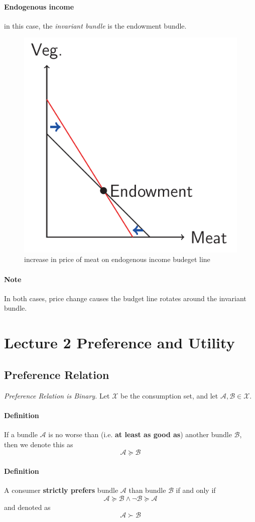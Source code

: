 \documentclass{article}
\newcommand{\mc}[1]{\mathcal{#1}}
\begin{document}
				\paragraph{Endogenous income} in this case, the \emph{invariant bundle} is the endowment bundle.
				\begin{figure}[h]
					\centering
					\includegraphics[width=0.5\linewidth]{figure/lec1_3}
					\caption{increase in price of meat on endogenous income budeget line}
				\end{figure}
				\paragraph{Note} In both cases, price change causes the budget line rotates around the invariant bundle.
				
				
	\section{Lecture 2 Preference and Utility}
		\subsection{Preference Relation}
			\emph{Preference Relation is Binary.}
			Let $\mc{X}$ be the consumption set, and let $\mc{A}, \mc{B} \in \mc{X}$.
			\paragraph{Definition} If a bundle $\mathcal{A}$ is no worse than (i.e. \textbf{at least as good as}) another bundle $\mathcal{B}$, then we denote this as
				\[
					\mathcal{A} \succcurlyeq \mathcal{B}
				\]
			\paragraph{Definition} A consumer \textbf{strictly prefers} bundle $\mathcal{A}$ than bundle $\mathcal{B}$ if and only if 
				\[
					\mc{A} \succcurlyeq \mc{B} \land \neg \mc{B} \succcurlyeq \mc{A}
				\]
				and denoted as
				\[
					\mc{A} \succ \mc{B}
				\]
\end{document}
